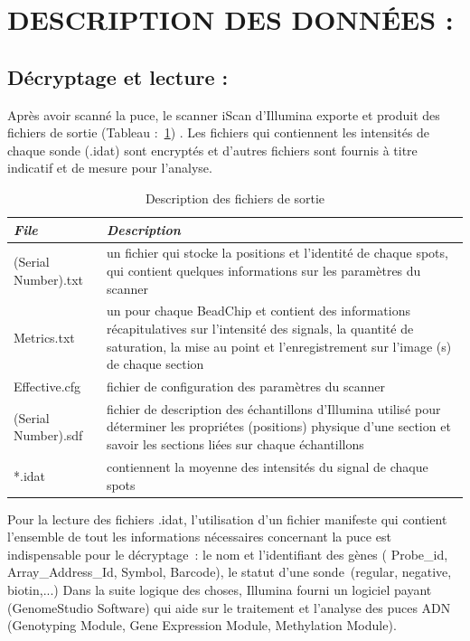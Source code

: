 \documentclass[a4paper,10pt]{article}
\begin{document}
\section{DESCRIPTION DES DONN\'{E}ES :}
\subsection{ Décryptage et lecture :}
Après avoir scanné la puce, le scanner iScan d’Illumina exporte et produit des fichiers de sortie (Tableau :~\ref{Fichiers_Sorties}) .
Les fichiers qui contiennent les intensités de chaque sonde (.idat) sont encryptés et d’autres fichiers sont fournis à titre indicatif et de mesure pour l’analyse.\\
\begin{table}[!ht]
\begin{tabular}{|p{3cm}|p{9cm}|}
\hline
\emph{File}  & \emph{Description} \\
\hline
 (Serial Number).txt & un fichier qui stocke la positions et l'identité de chaque spots, qui contient quelques informations sur les paramètres du scanner\\
\hline
Metrics.txt &  un pour chaque BeadChip  et contient des informations récapitulatives sur l'intensité des signals,
la quantité de saturation, la mise au point et l'enregistrement sur l'image (s) de chaque section \\
\hline 
Effective.cfg & fichier de configuration des paramètres du scanner\\
\hline
(Serial Number).sdf & fichier de description des échantillons d'Illumina utilisé pour déterminer les propriétes (positions)
physique d'une section et savoir les sections liées sur chaque échantillons\\
\hline
*.idat & contiennent la moyenne des intensités du signal de chaque spots \\
\hline
\end{tabular}
\caption{Description des fichiers de sortie}
\label{Fichiers_Sorties}
\end{table}
\newline
Pour la lecture  des fichiers .idat, l’utilisation d’un fichier manifeste qui contient l’ensemble de tout les informations nécessaires concernant la puce est indispensable pour le décryptage : le nom et l’identifiant  des gènes ( Probe\_id, Array\_Address\_Id, Symbol, Barcode), le statut d’une sonde (regular, negative, biotin,...)
Dans la suite logique des choses, Illumina fourni un logiciel payant (GenomeStudio Software)  qui aide sur le traitement et l'analyse des puces ADN (Genotyping Module, Gene Expression Module, Methylation Module).
\end{document}
